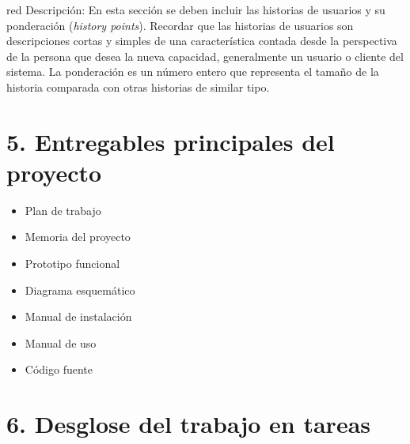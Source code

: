 \documentclass[11pt]{charter}
\begin{document}
\begin{consigna}{red}
Descripción: En esta sección se deben incluir las historias de usuarios y su ponderación (\textit{history points}). Recordar que las historias de usuarios son descripciones cortas y simples de una característica contada desde la perspectiva de la persona que desea la nueva capacidad, generalmente un usuario o cliente del sistema. La ponderación es un número entero que representa el tamaño de la historia comparada con otras historias de similar tipo.
\end{consigna}

\section{5. Entregables principales del proyecto}
\label{sec:entregables}


\begin{itemize}
\item Plan de trabajo
\item Memoria del proyecto
\item Prototipo funcional
\item Diagrama esquemático
\item Manual de instalación
\item Manual de uso
\item Código fuente
 
\end{itemize}

\section{6. Desglose del trabajo en tareas}
\label{sec:wbs}
\end{document}
